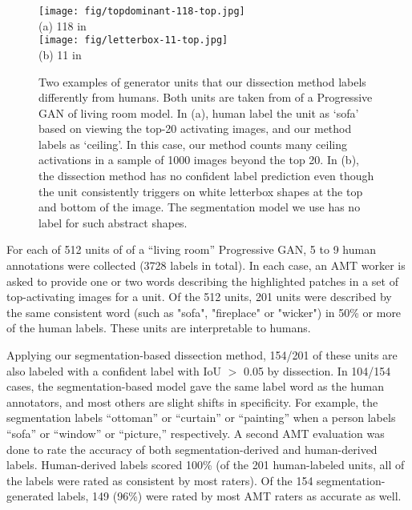 \documentclass{article} %
\begin{document}
\begin{figure}[t]
\centering
\texttt{[image: fig/topdominant-118-top.jpg]} \\
(a) \unit{118} in  \\
\vspace{3pt}
\texttt{[image: fig/letterbox-11-top.jpg]} \\
(b) \unit{11} in 
\vspace{-3pt}
\caption{Two examples of generator units that our dissection method labels differently from humans.  Both units are taken from  of a Progressive GAN of living room model.  In (a), human label the unit as `sofa' based on viewing the top-20 activating images, and our method labels as `ceiling'.  In this case, our method counts many ceiling activations in a sample of 1000 images beyond the top 20.  In (b),  the dissection method has no confident label prediction even though the unit consistently triggers on white letterbox shapes at the top and bottom of the image.  The segmentation model we use has no label for such abstract shapes.}
\vspace{-10pt}
\end{figure}
For each of 512 units of  of a ``living room'' Progressive GAN,  5 to 9 human annotations were collected (3728 labels in total). In each case, an AMT worker is asked to provide one or two words describing the highlighted patches in a set of top-activating images for a unit.  Of the 512 units, 201 units were described by the same consistent word (such as "sofa", "fireplace" or "wicker") in 50\% or more of the human labels.  These units are interpretable to humans.

Applying our segmentation-based dissection method, 154/201 of these units are also labeled with a confident label with IoU $>$ 0.05 by dissection.  In 104/154 cases, the segmentation-based model gave the same label word as the human annotators, and most others are slight shifts in specificity. For example, the segmentation labels ``ottoman'' or ``curtain'' or ``painting'' when a person labels ``sofa'' or ``window'' or ``picture,'' respectively.  A second AMT evaluation was done to rate the accuracy of both segmentation-derived and human-derived labels.  Human-derived labels scored 100\% (of the 201 human-labeled units, all of the labels were rated as consistent by most raters).  Of the 154 segmentation-generated labels, 149 (96\%) were rated by most AMT raters as accurate as well.
\end{document}
